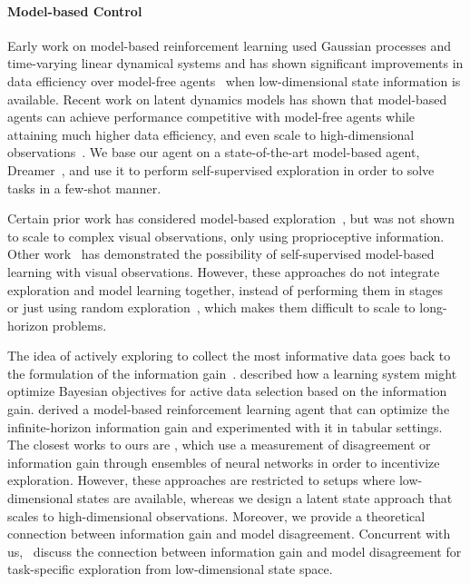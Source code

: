 \documentclass{article}
\begin{document}
\paragraph{Model-based Control}
%
Early work on model-based reinforcement learning used Gaussian processes and time-varying linear dynamical systems and has shown significant improvements in data efficiency over model-free agents~\cite{kaelbling1996reinforcement,deisenroth2011pilco,levine2013guided} when low-dimensional state information is available.
Recent work on latent dynamics models has shown that model-based agents can achieve performance competitive with model-free agents while attaining much higher data efficiency, and even scale to high-dimensional observations~\cite{chua2018deep,buesing2018learning,ebert2018visual,ha2018world,hafner2018planet,nagabandi2019deep}. We base our agent on a state-of-the-art model-based agent, Dreamer~\cite{hafner2019dreamer}, and use it to perform self-supervised exploration in order to solve tasks in a few-shot manner.
%

Certain prior work has considered model-based exploration~\cite{amos2018awareness, sharma2019dynamics}, but was not shown to scale to complex visual observations, only using proprioceptive information. Other work~\cite{ebert2018visual,pathak2018zero} has demonstrated the possibility of self-supervised model-based learning with visual observations. However, these approaches do not integrate exploration and model learning together, instead of performing them in stages~\cite{pathak2018zero} or just using random exploration~\cite{ebert2018visual}, which makes them difficult to scale to long-horizon problems.

The idea of actively exploring to collect the most informative data goes back to the formulation of the information gain~\cite{lindley1956expinfogain}. \citet{mackay1992infogain} described how a learning system might optimize Bayesian objectives for active data selection based on the information gain. \citet{sun2011planning} derived a model-based reinforcement learning agent that can optimize the infinite-horizon information gain and experimented with it in tabular settings.
%
The closest works to ours are \citet{shyam2019max, henaff2019explicit}, which use a measurement of disagreement or information gain through ensembles of neural networks in order to incentivize exploration. However, these approaches are restricted to setups where low-dimensional states are available, whereas we design a latent state approach that scales to high-dimensional observations. Moreover, we provide a theoretical connection between information gain and model disagreement. Concurrent with us,~\citet{ball2020ready} discuss the connection between information gain and model disagreement for task-specific exploration from low-dimensional state space.
%
\end{document}
